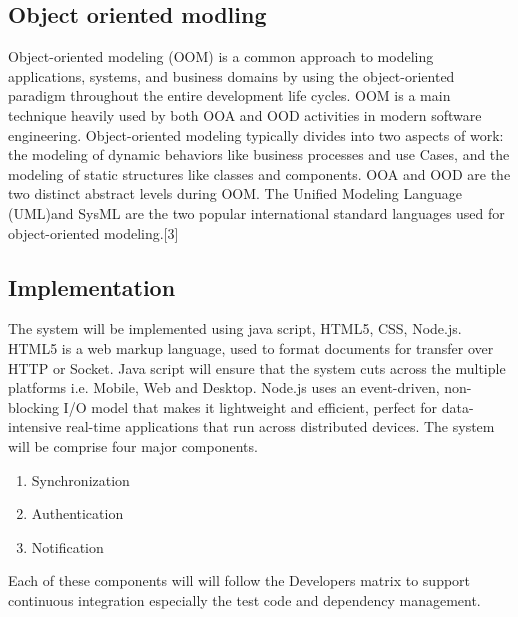 \documentclass[a4paper,12pt]{article}
\begin{document}
\subsection{Object oriented modling}
Object-oriented modeling (OOM) is a common approach to modeling applications, systems, and business domains by using the object-oriented paradigm throughout the entire development life cycles. OOM is a main technique heavily used by both OOA and OOD activities in modern software engineering.
Object-oriented modeling typically divides into two aspects of work: the modeling of dynamic behaviors like business processes and use Cases, and the modeling of static structures like classes and components. OOA and OOD are the two distinct abstract levels during OOM. The  Unified Modeling Language (UML)and SysML are the two popular international standard languages used for object-oriented modeling.[3]


\subsection{Implementation}
The system will be implemented using java script, HTML5, CSS, Node.js. HTML5 is a web markup language, used to format documents for transfer over HTTP or Socket.  Java script will ensure that the system cuts across the multiple platforms i.e. Mobile, Web and Desktop. Node.js uses an event-driven, non-blocking I/O model that makes it lightweight and efficient, perfect for data-intensive real-time applications that run across distributed devices.
The system will be comprise four major components.
\begin{enumerate}[label=(\roman*)]
\item Synchronization
\item Authentication
\item Notification
\end{enumerate}
Each of these components will will follow the Developers matrix to support continuous integration especially the test code and dependency management. 
\end{document}
